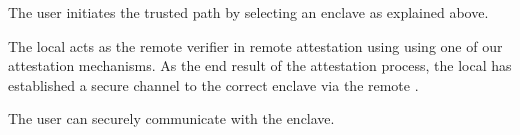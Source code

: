 \begin{mylist}
	\item[\one] The user initiates the trusted path by selecting an enclave as explained above.
	\item[\two] The local \device acts as the remote verifier in remote attestation using using one of our attestation mechanisms. As the end result of the attestation process, the local \device has established a secure channel to the correct enclave via the remote \device.
	\item[\three] The user can securely communicate with the enclave.
\end{mylist}




